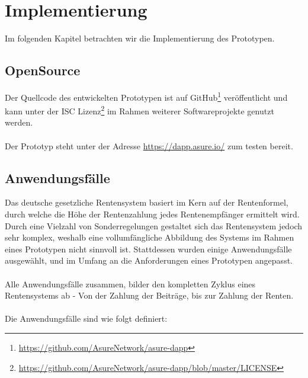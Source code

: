 \section{Implementierung}
Im folgenden Kapitel betrachten wir die Implementierung des Prototypen.


\subsection{OpenSource}
Der Quellcode des entwickelten Prototypen ist auf GitHub\footnote{\url{https://github.com/AsureNetwork/asure-dapp}} veröffentlicht und kann unter der ISC Lizenz\footnote{\url{https://github.com/AsureNetwork/asure-dapp/blob/master/LICENSE}} im Rahmen weiterer Softwareprojekte genutzt werden.

\paragraph*{}
Der Prototyp steht unter der Adresse \url{https://dapp.asure.io/} zum testen bereit. 

\subsection{Anwendungsfälle}
Das deutsche gesetzliche Rentensystem basiert im Kern auf der Rentenformel, durch welche die Höhe der Rentenzahlung jedes Rentenempfänger ermittelt wird. Durch eine Vielzahl von Sonderregelungen gestaltet sich das Rentensystem jedoch sehr komplex, weshalb eine vollumfängliche Abbildung des Systems im Rahmen eines Prototypen nicht sinnvoll ist. Stattdessen wurden einige Anwendungsfälle ausgewählt, und im Umfang an die Anforderungen eines Prototypen angepasst.

\paragraph{}
Alle Anwendungsfälle zusammen, bilder den kompletten Zyklus eines Rentensystems ab - Von der Zahlung der Beiträge, bis zur Zahlung der Renten.

\paragraph{}
Die Anwendungsfälle sind wie folgt definiert:

